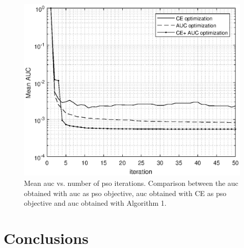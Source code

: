 \documentclass[twocolumns]{IEEEtran}
\begin{document}
\begin{figure}[t]
    \centering
    \includegraphics[width=1\columnwidth]{CE_vsAUC.eps}
    \caption{Mean \ac{auc} vs. number of \ac{pso} iterations. Comparison between the \ac{auc} obtained with \ac{auc} as \ac{pso} objective, \ac{auc} obtained with \ac{CE} as \ac{pso} objective and \ac{auc} obtained with Algorithm 1. }
    \label{fig:CEvsAUC}
\end{figure}

\section{Conclusions}

\renewcommand*{\bibfont}{\footnotesize}

\printbibliography
\balance
\end{document}
